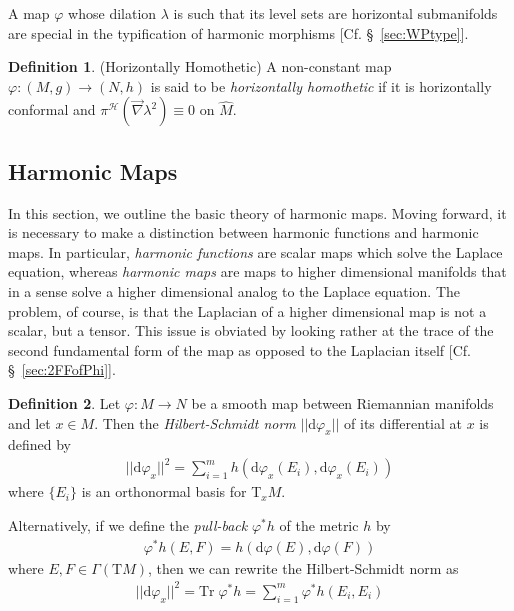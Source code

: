 \documentclass[12pt]{article}
\newcommand{\diff}{\text{d}}
\theoremstyle{definition}
\newtheorem{definition}{Definition}[section]
\numberwithin{equation}{subsection}
\begin{document}
A map $\varphi$ whose dilation $\lambda$ is such that its level sets are horizontal submanifolds are special in the typification of harmonic morphisms [Cf. \S~\ref{sec:WPtype}].
\begin{definition} \label{def: HorHomo}
(Horizontally Homothetic) A non-constant map $\varphi:(M,g) \rightarrow (N,h)$ is said to be \textit{horizontally homothetic} if it is horizontally conformal and $\pi^\mathcal{H}(\vec{\nabla} \lambda^2) \equiv 0$ on $\hat{M}$.
\end{definition}

\subsection{Harmonic Maps}
In this section, we outline the basic theory of harmonic maps. Moving forward, it is necessary to make a  distinction between harmonic functions and harmonic maps. In particular, \textit{harmonic functions} are scalar maps which solve the Laplace equation, whereas \textit{harmonic maps} are maps to higher dimensional manifolds that in a sense solve a higher dimensional analog to the Laplace equation. The problem, of course, is that the Laplacian of a higher dimensional map is not a scalar, but a tensor. This issue is obviated by looking rather at the trace of the second fundamental form of the map as opposed to the Laplacian itself [Cf. \S~\ref{sec:2FFofPhi}].

\begin{definition}
Let $\varphi: M \rightarrow N$ be a smooth map between Riemannian manifolds and let $x \in M$. Then the \textit{Hilbert-Schmidt norm} $||\diff \varphi_x||$ of its differential at $x$ is defined by
\begin{align}
|| \diff \varphi_x||^2 = \sum_{i=1}^m h(\diff \varphi_x(E_i) , \diff \varphi_x(E_i))
\end{align}
where $\{E_i\}$  is an orthonormal basis for T$_xM$.
\end{definition}
Alternatively, if we define the \textit{pull-back} $\varphi^*h$ of the metric $h$ by 
\begin{align}
   \varphi^*h(E,F) =  h(\diff \varphi(E) , \diff \varphi(F))
\end{align}
where $E,F \in \Gamma(\text{T}M)$, then we can rewrite the Hilbert-Schmidt norm as
\begin{align}
    ||\diff \varphi_x||^2 = \text{Tr}\; \varphi^* h = \sum_{i=1}^m \varphi^*h(E_i ,E_i)
\end{align}
\end{document}

